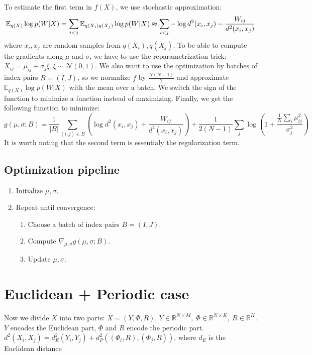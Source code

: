 \documentclass{article}
\newcommand{\N}{\mathcal{N}}
\newcommand{\E}{\mathbb{E}}
\newcommand{\R}{\mathbb{R}}
\begin{document}
To estimate the first term in $f(X)$, we use stochastic approximation:
\begin{equation}
    \E_{q(X)} \log p(W|X) =
    \sum\limits_{i < j} \E_{q(X_i)q(X_j)} \log p(W|X) \thickapprox 
    \sum\limits_{i < j} -\log d^2(x_i, x_j) - \frac{W_{ij}}{d^2(x_i, x_j)}
\end{equation}
where $x_i, x_j$ are random samples from $q(X_i), q(X_j)$.
To be able to compute the gradients along $\mu$ and $\sigma$, we have to use the reparametrization trick:
$X_{ij} = \mu_{ij} + \sigma_j\xi, \xi \sim \N(0, 1)$.
We also want to use the optimization by batches of index pairs $B = (I, J)$,
so we normalize $f$ by $\frac{N(N - 1)}{2}$ and approximate $\E_{q(X)} \log p(W|X)$ with the mean over a batch.
We switch the sign of the function to minimize a function instead of maximizing.
Finally, we get the following function to minimize:
\begin{equation}
    g(\mu, \sigma; B) =
    \frac{1}{|B|}\sum\limits_{(i, j) \in B} \left( \log d^2(x_i, x_j) + \frac{W_{ij}}{d^2(x_i, x_j)} \right) +
    \frac{1}{2(N - 1)} \sum\limits_j \log\left(1 + \frac{\frac{1}{N}\sum\limits_i \mu_{ij}^2}{\sigma_j^2}\right)
\end{equation}
It is worth noting that the second term is essentialy the regularization term.

\subsection{Optimization pipeline}

\begin{enumerate}
    \item Initialize $\mu, \sigma$.
    \item Repeat until convergence:
    \begin{enumerate}
        \item Choose a batch of index pairs $B = (I, J)$.
        \item Compute $\nabla_{\mu, \sigma} g(\mu, \sigma; B)$.
        \item Update $\mu, \sigma$.
    \end{enumerate}
\end{enumerate}

\section{Euclidean + Periodic case}

Now we divide $X$ into two parts: $X = (Y, \Phi, R)$, $Y \in \R^{N \times M},\ \Phi \in \R^{N \times K},\ R \in \R^K$.
$Y$ encodes the Euclidean part, $\Phi$ and $R$ encode the periodic part.
$d^2(X_i, X_j) = d_E^2(Y_i, Y_j) + d_P^2((\Phi_i, R), (\Phi_j, R))$, where $d_E$ is the Euclidean distance
\end{document}
